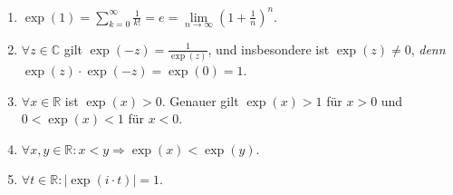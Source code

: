 \begin{enumerate}[leftmargin=*]
    \item $\exp(1) = \sum\limits_{k=0}^\infty \frac{1}{k!} = e = \lim\limits_{n \to \infty} (1 + \frac{1}{n})^n$.
    \item $\forall z \in \mathbb{C}$ gilt $\exp(-z) = \frac{1}{\exp(z)}$, und insbesondere ist $\exp(z) \neq 0$, \textit{denn} $\exp(z) \cdot \exp(-z) = \exp(0) = 1$.
    \item $\forall x \in \mathbb{R}$ ist $\exp(x) > 0$. Genauer gilt $\exp(x) > 1$ für $x > 0$ und $0 < \exp(x) < 1$ für $x < 0$.
    \item $\forall x, y \in \mathbb{R}: x<y \Rightarrow \exp(x) < \exp(y)$.
    \item $\forall t \in \mathbb{R}: |\exp(i \cdot t)| = 1$.
\end{enumerate}